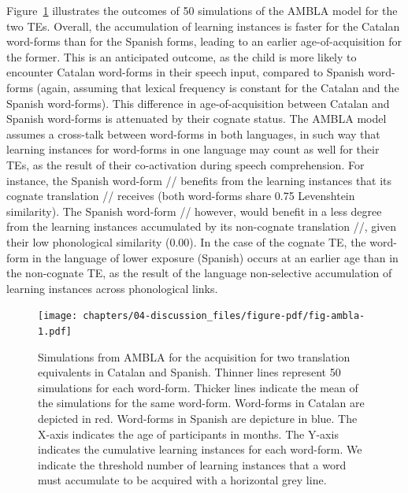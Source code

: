 \documentclass[
  12pt,
  b5paperpaper,
  twoside]{scrreprt}
\begin{document}
Figure~\ref{fig-ambla} illustrates the outcomes of 50 simulations of the
AMBLA model for the two TEs. Overall, the accumulation of learning
instances is faster for the Catalan word-forms than for the Spanish
forms, leading to an earlier age-of-acquisition for the former. This is
an anticipated outcome, as the child is more likely to encounter Catalan
word-forms in their speech input, compared to Spanish word-forms (again,
assuming that lexical frequency is constant for the Catalan and the
Spanish word-forms). This difference in age-of-acquisition between
Catalan and Spanish word-forms is attenuated by their cognate status.
The AMBLA model assumes a cross-talk between word-forms in both
languages, in such way that learning instances for word-forms in one
language may count as well for their TEs, as the result of their
co-activation during speech comprehension. For instance, the Spanish
word-form // benefits from the learning instances that
its cognate translation // receives (both word-forms share
0.75 Levenshtein similarity). The Spanish word-form //
however, would benefit in a less degree from the learning instances
accumulated by its non-cognate translation //, given their
low phonological similarity (0.00). In the case of the cognate TE, the
word-form in the language of lower exposure (Spanish) occurs at an
earlier age than in the non-cognate TE, as the result of the language
non-selective accumulation of learning instances across phonological
links.

\newpage

\begin{figure}

{\centering \texttt{[image: chapters/04-discussion\_files/figure-pdf/fig-ambla-1.pdf]}

}

\caption{\label{fig-ambla}Simulations from AMBLA for the acquisition for
two translation equivalents in Catalan and Spanish. Thinner lines
represent 50 simulations for each word-form. Thicker lines indicate the
mean of the simulations for the same word-form. Word-forms in Catalan
are depicted in red. Word-forms in Spanish are depicture in blue. The
X-axis indicates the age of participants in months. The Y-axis indicates
the cumulative learning instances for each word-form. We indicate the
threshold number of learning instances that a word must accumulate to be
acquired with a horizontal grey line.}

\end{figure}
\end{document}
